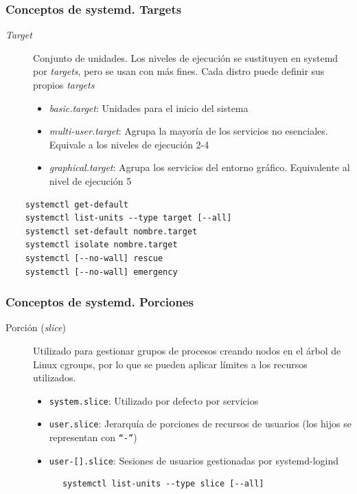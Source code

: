 \documentclass[aspectratio=169]{beamer}
\begin{document}
\begin{frame}[fragile]
  \frametitle{Conceptos de systemd. Targets}
  \begin{description}
  \item[\textit{Target}] Conjunto de unidades. Los niveles de ejecución se sustituyen en systemd por \textit{targets}, pero se usan con más fines. Cada distro puede definir sus propios \textit{targets}
    \begin{itemize}
    \item \textit{basic.target}: Unidades para el inicio del sistema
    \item \textit{multi-user.target}: Agrupa la mayoría de los servicios no esenciales. Equivale a los niveles de ejecución 2-4
    \item \textit{graphical.target}: Agrupa los servicios del entorno gráfico. Equivalente al nivel de ejecución 5
    \end{itemize}
  \end{description}
  \begin{lstlisting}
    systemctl get-default
    systemctl list-units --type target [--all]
    systemctl set-default nombre.target
    systemctl isolate nombre.target
    systemctl [--no-wall] rescue
    systemctl [--no-wall] emergency
  \end{lstlisting}
\end{frame}

\begin{frame}[fragile]
  \frametitle{Conceptos de systemd. Porciones}
  \begin{description}
  \item[Porción (\textit{slice})] Utilizado para gestionar grupos de procesos creando nodos en el árbol de Linux cgroups, por lo que se pueden aplicar límites a los recursos utilizados.
    \begin{itemize}
    \item \texttt{system.slice}: Utilizado por defecto por servicios
    \item \texttt{user.slice}: Jerarquía de porciones de recursos de usuarios (los hijos se representan con \texttt{``-''})
    \item \texttt{user-[].slice}: Sesiones de usuarios gestionadas por systemd-logind
    \end{itemize}
    \begin{lstlisting}
      systemctl list-units --type slice [--all]
    \end{lstlisting}
  \end{description}
\end{frame}
\end{document}
